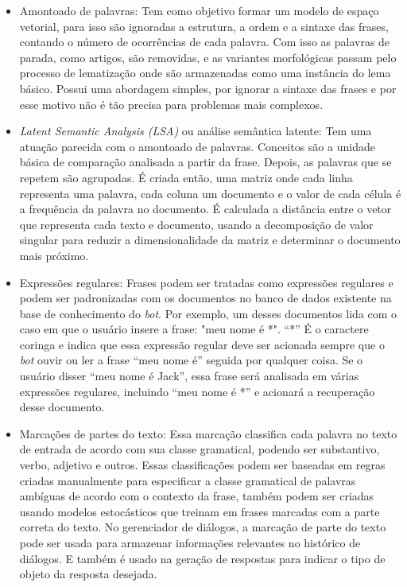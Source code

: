 \documentclass[
	12pt,				%
	oneside,
	a4paper,			%
	english,			%
	french,				%
	spanish,			%
	brazil				%
	]{abntex2}
\begin{document}
\begin{itemize}
	\item Amontoado de palavras: Tem como objetivo formar um modelo de espaço vetorial, para isso são ignoradas a estrutura, a ordem e a sintaxe das frases, contando o número de ocorrências de cada palavra. Com isso as palavras de parada, como artigos, são removidas, e as variantes morfológicas passam pelo processo de lematização onde são armazenadas como uma instância do lema básico. Possui uma abordagem simples, por ignorar a sintaxe das frases e por esse motivo não é tão precisa para problemas mais complexos.
	\item \emph{Latent Semantic Analysis (LSA)} ou análise semântica latente: Tem uma atuação parecida com o amontoado de palavras. Conceitos são a unidade básica de comparação analisada a partir da frase. Depois, as palavras que se repetem são agrupadas. É criada então, uma matriz onde cada linha representa uma palavra, cada coluna um documento e o valor de cada célula é a frequência da palavra no documento. É calculada a distância entre o vetor que representa cada texto e documento, usando a decomposição de valor singular para reduzir a dimensionalidade da matriz e determinar o documento mais próximo.
	\item Expressões regulares: Frases podem ser tratadas como expressões regulares e podem ser padronizadas com os documentos no banco de dados existente na base de conhecimento do \emph{bot}. Por exemplo, um desses documentos lida com o caso em que o usuário insere a frase: "meu nome é *". “*” É o caractere coringa e indica que essa expressão regular deve ser acionada sempre que o \emph{bot} ouvir ou ler a frase “meu nome é” seguida por qualquer coisa. Se o usuário disser “meu nome é Jack”, essa frase será analisada em várias expressões regulares, incluindo “meu nome é *” e acionará a recuperação desse documento. 
	\item Marcações de partes do texto: Essa marcação classifica cada palavra no texto de entrada de acordo com sua classe gramatical, podendo ser substantivo, verbo, adjetivo e outros. Essas classificações podem ser baseadas em regras criadas manualmente para especificar a classe gramatical de palavras ambíguas de acordo com o contexto da frase, também podem ser criadas usando modelos estocásticos que treinam em frases marcadas com a parte correta do texto. No gerenciador de diálogos, a marcação de parte do texto pode ser usada para armazenar informações relevantes no histórico de diálogos. E também é usado na geração de respostas para indicar o tipo de objeto da resposta desejada. 

\end{itemize}
\end{document}
